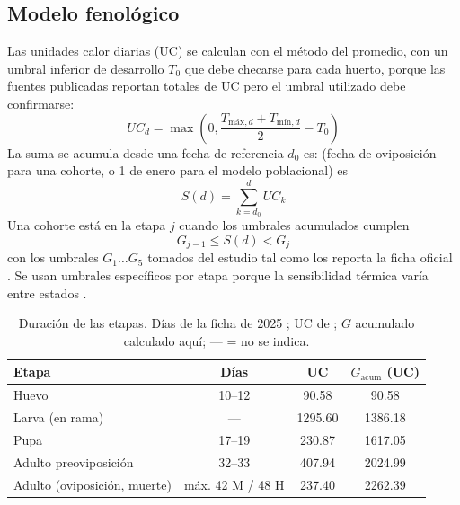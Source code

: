 \documentclass[conference]{IEEEtran}
\begin{document}
\subsection{Modelo fenológico}
Las unidades calor diarias (UC) se calculan con el método del promedio, con un umbral inferior de desarrollo $T_0$ que debe checarse para cada huerto, porque las fuentes publicadas reportan totales de UC pero el umbral utilizado debe confirmarse:
\begin{equation}
UC_{d} = \max\left(0, \frac{T_{\text{máx},d} + T_{\text{mín},d}}{2} - T_{0}\right)
\end{equation}
La suma se acumula desde una fecha de referencia $d_{0}$  es: (fecha de oviposición para una cohorte, o 1 de enero para el modelo poblacional) es
\begin{equation}
S(d) = \sum_{k=d_0}^{d} UC_{k}
\end{equation}
Una cohorte está en la etapa $j$ cuando los umbrales acumulados cumplen
\begin{equation}
G_{j-1} \le S(d) < G_{j}
\end{equation}
con los umbrales $G_{1}\dots G_{5}$ tomados del estudio \cite{ref10} tal como los reporta la ficha oficial \cite{ref1}. Se usan umbrales específicos por etapa porque la sensibilidad térmica varía entre estados \cite{ref20}.



\begin{table}[htbp]
\centering
\caption{Duración de las etapas. Días de la ficha de 2025 \cite{ref6}; UC de \cite{ref1,ref10}; $G$ acumulado calculado aquí; --- = no se indica.}
\label{tab:etapas}
\setlength{\tabcolsep}{3.5pt}
\footnotesize
\begin{tabular}{lccc}
\toprule
\textbf{Etapa} & \textbf{Días} & \textbf{UC} & \textbf{$G_{\text{acum}}$ (UC)} \\
\midrule
Huevo & 10--12 & 90.58 & 90.58 \\
Larva (en rama) & --- & 1295.60 & 1386.18 \\
Pupa & 17--19 & 230.87 & 1617.05 \\
Adulto preoviposición & 32--33 & 407.94 & 2024.99 \\
Adulto (oviposición, muerte) & máx. 42 M / 48 H & 237.40 & 2262.39 \\
\bottomrule
\end{tabular}
\end{table}
\end{document}
